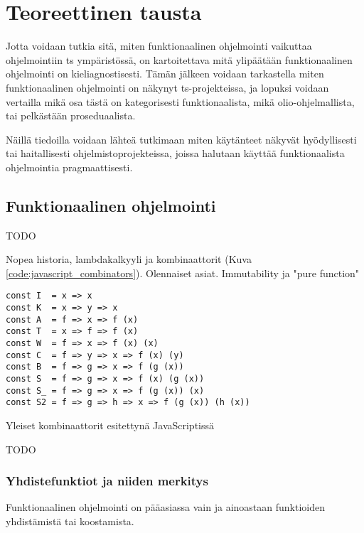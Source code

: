 \vspace{21.5pt}
\chapter{Teoreettinen tausta}

Jotta voidaan tutkia sitä, miten funktionaalinen ohjelmointi vaikuttaa ohjelmointiin \gls{ts} ympäristössä, on kartoitettava mitä ylipäätään funktionaalinen ohjelmointi on kieliagnostisesti. Tämän jälkeen voidaan tarkastella miten funktionaalinen ohjelmointi on näkynyt \gls{ts}-projekteissa, ja lopuksi voidaan vertailla mikä osa tästä on kategorisesti funktionaalista, mikä olio-ohjelmallista, tai pelkästään proseduaalista.

Näillä tiedoilla voidaan lähteä tutkimaan miten käytänteet näkyvät hyödyllisesti tai haitallisesti ohjelmistoprojekteissa, joissa halutaan käyttää funktionaalista ohjelmointia pragmaattisesti.

\section{Funktionaalinen ohjelmointi}

TODO

Nopea historia, lambdakalkyyli ja kombinaattorit (Kuva \ref{code:javascript_combinators}). Olennaiset asiat. Immutability ja "pure function"

\begin{code}
	\begin{verbatim}
const I  = x => x
const K  = x => y => x
const A  = f => x => f (x)
const T  = x => f => f (x)
const W  = f => x => f (x) (x)
const C  = f => y => x => f (x) (y)
const B  = f => g => x => f (g (x))
const S  = f => g => x => f (x) (g (x))
const S_ = f => g => x => f (g (x)) (x)
const S2 = f => g => h => x => f (g (x)) (h (x))
\end{verbatim}
	\caption{Yleiset kombinaattorit esitettynä JavaScriptissä \cite{javascript_combinators}}
	\label{code:javascript_combinators}
\end{code}

TODO

\subsection{Yhdistefunktiot ja niiden merkitys}

Funktionaalinen ohjelmointi on pääasiassa vain ja ainoastaan funktioiden yhdistämistä tai koostamista.


